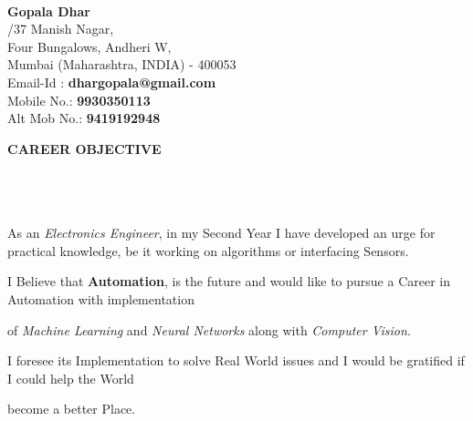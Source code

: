 \documentclass[a4paper,10pt]{article}
\newcommand{\lsep}{-0.5cm}
\newcommand{\resheading}[1]{{\small \colorbox{mygrey}{\begin{minipage}{0.975\textwidth}{\textbf{#1 \vphantom{p\^{E}}}}\end{minipage}}}}
\begin{document}
\hspace{0.5cm}\\[-0.2cm]
\indent \Large \textbf{Gopala Dhar} \\         
\normalsize
{}/37 Manish Nagar, \\
\indent Four Bungalows, Andheri W,  \\                                                                                                                                                                                                                                                           
\indent Mumbai (Maharashtra, INDIA) - 400053\\
\indent Email-Id : \textbf{dhargopala@gmail.com} \\
\indent Mobile No.: \textbf{9930350113} \\
\indent Alt Mob No.: \textbf{9419192948} \hfill
{}\\  


\resheading{\textbf{CAREER OBJECTIVE} }\\[\lsep]\\\\
\indent As an \textit{Electronics Engineer}, in my Second Year I have developed an urge for practical knowledge, be it working \indent on algorithms or interfacing Sensors.\par I Believe that \textbf{Automation}, is the future and would like to pursue a Career in Automation with implementation \par of \textit{Machine Learning} and \textit{Neural Networks} along with \textit{Computer Vision}. \par I foresee its Implementation to solve Real World issues and I would be gratified if I could help the World \par become a better Place.\\
\end{document}

